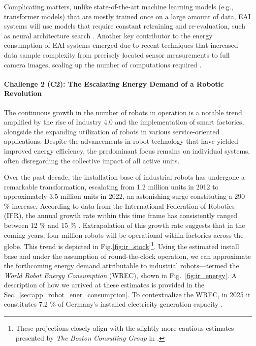 \documentclass[12pt]{article}
\begin{document}
Complicating matters, unlike state-of-the-art machine learning models (e.g., transformer models) that are mostly trained once on a large amount of data, EAI systems will use models that require constant retraining and re-evaluation, such as neural architecture search \cite{real2019regularized}. Another key contributor to the energy consumption of EAI systems emerged due to recent techniques that increased data sample complexity from precisely located sensor measurements to full camera images, scaling up the number of computations required \cite{krizhevsky2012imagenet}.

\paragraph*{\textbf{Challenge 2} (C2): The Escalating Energy Demand of a Robotic Revolution}\label{sec:robots_challenge}
The continuous growth in the number of robots in operation is a notable trend amplified by the rise of Industry 4.0 and the implementation of smart factories, alongside the expanding utilization of robots in various service-oriented applications. Despite the advancements in robot technology that have yielded improved energy efficiency, the predominant focus remains on individual systems, often disregarding the collective impact of all active units.

Over the past decade, the installation base of industrial robots has undergone a remarkable transformation, escalating from 1.2 million units in 2012 to approximately 3.5 million units in 2022, an astonishing surge constituting a 290 \% increase. According to data from the International Federation of Robotics (IFR), the annual growth rate within this time frame has consistently ranged between 12 \% and 15 \% \cite{IFR2019}. Extrapolation of this growth rate suggests that in the coming years, four million robots will be operational within factories across the globe. This trend is depicted in Fig.\ref{fig:ir_stock}\footnote{These projections closely align with the slightly more cautious estimates presented by \textit{The Boston Consulting Group} in \cite{sirkin2015}.}. Using the estimated install base and under the assumption of round-the-clock operation, we can approximate the forthcoming energy demand attributable to industrial robots---termed the \textit{World Robot Energy Consumption} (WREC), shown in Fig.~\ref{fig:ir_energy}. A description of how we arrived at these estimates is provided in the  Sec.~\ref{sec:app_robot_ener_consumption}. To contextualize the WREC, in 2025 it constitutes 7.2 \% of Germany's installed electricity generation capacity \cite{fraunhofer2016}.
\end{document}
